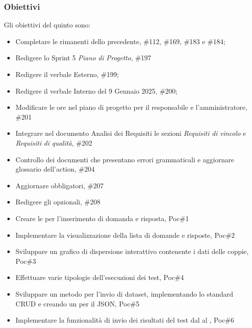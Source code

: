 \subsubsection{Obiettivi}
Gli obiettivi del quinto  sono:
\begin{itemize}
    \item Completare le  rimanenti dello  precedente,  \#112, \#169, \#183 e \#184;
    \item Redigere lo Sprint 5 \textit{Piano di Progetto},  \#197
    \item Redigere il verbale Esterno,  \#199;
    \item Redigere il verbale Interno del 9 Gennaio 2025,  \#200;
    \item Modificare le ore nel piano di progetto per il responsabile e l’amministratore,  \#201
    \item Integrare nel documento Analisi dei Requisiti le sezioni \textit{Requisiti di vincolo} e \textit{Requisiti di qualità},  \#202
    \item Controllo dei documenti che presentano errori grammaticali e aggiornare glossario dell'action,  \#204
    \item Aggiornare  obbligatori,  \#207
    \item Redigere gli  opzionali,  \#208
    \item Creare le  per l'inserimento di domanda e risposta,  Poc\#1
    \item Implementare la visualizzazione della lista di domande e risposte,  Poc\#2
    \item Sviluppare un grafico di dispersione interattivo contenente i dati delle coppie,  Poc\#3
    \item Effettuare varie tipologie dell'esecuzioni dei test,  Poc\#4
    \item Sviluppare un metodo per l’invio di dataset, implementando lo standard CRUD e creando un  per il JSON,  Poc\#5
    \item Implementare la funzionalità di invio dei risultati del test dal  al ,  Poc\#6
\end{itemize}